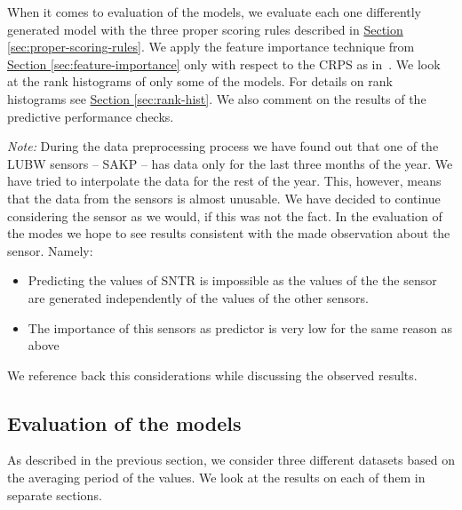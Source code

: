 \documentclass[12pt,a4paper,twoside]{scrartcl}
\numberwithin{equation}{section}
\newcommand{\refsec}[1]{\hyperref[#1]{Section \ref*{#1}}}
\begin{document}
When it comes to evaluation of the models, we evaluate each one differently generated model with the three proper scoring rules described in \refsec{sec:proper-scoring-rules}. We apply the feature importance technique from \refsec{sec:feature-importance} only with respect to the CRPS as in~\cite{lerch2018}. We look at the rank histograms of only some of the models. For details on rank histograms see \refsec{sec:rank-hist}. We also comment on the results of the predictive performance checks.

\emph{Note:} During the data preprocessing process we have found out that one of the LUBW sensors -- SAKP -- has data only for the last three months of the year. We have tried to interpolate the data for the rest of the year. This, however, means that the data from the sensors is almost unusable. We have decided to continue considering the sensor as we would, if this was not the fact. In the evaluation of the modes we hope to see results consistent with the made observation about the sensor. Namely:
\begin{itemize}
\item Predicting the values of SNTR is impossible as the values of the the sensor are generated independently of the values of the other sensors.
\item The importance of this sensors as predictor is very low for the same reason as above
\end{itemize}
We reference back this considerations while discussing the observed results.
\subsection{Evaluation of the models}\label{sec:eval-model}
As described in the previous section, we consider three different datasets based on the averaging period of the values. We look at the results on each of them in separate sections.
\end{document}

